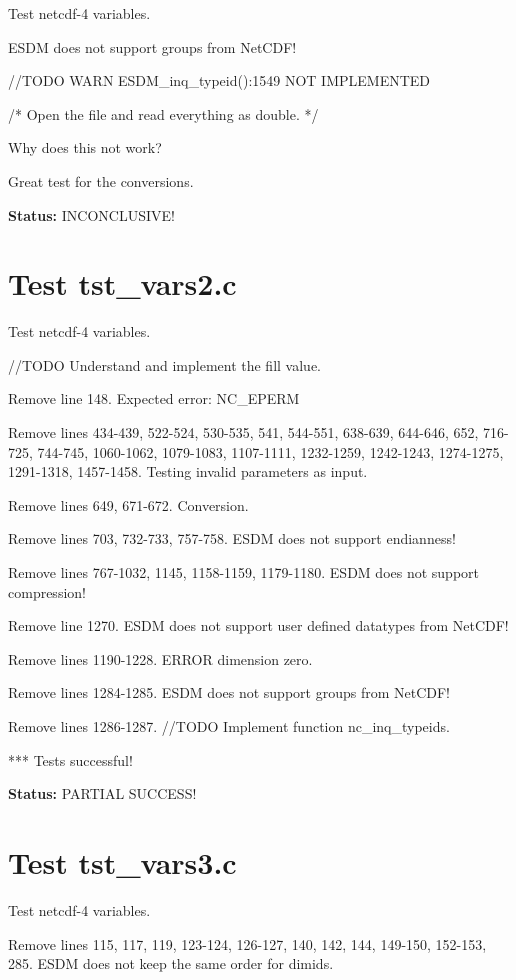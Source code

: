 Test netcdf-4 variables.

ESDM does not support groups from NetCDF!

//TODO WARN ESDM\_inq\_typeid():1549 NOT IMPLEMENTED

/* Open the file and read everything as double. */

Why does this not work?

Great test for the conversions.

{\bf \large Status: } INCONCLUSIVE!

\section{Test tst\_vars2.c}

Test netcdf-4 variables.

//TODO Understand and implement the fill value.

Remove line 148. Expected error: NC\_EPERM

Remove lines 434-439, 522-524, 530-535, 541, 544-551, 638-639, 644-646, 652, 716-725, 744-745, 1060-1062, 1079-1083, 1107-1111, 1232-1259, 1242-1243, 1274-1275, 1291-1318, 1457-1458. Testing invalid parameters as input.

Remove lines 649, 671-672. Conversion.

Remove lines 703, 732-733, 757-758. ESDM does not support endianness!

Remove lines 767-1032, 1145, 1158-1159, 1179-1180. ESDM does not support compression!

Remove line 1270. ESDM does not support user defined datatypes from NetCDF!

Remove lines 1190-1228. ERROR dimension zero.

Remove lines 1284-1285. ESDM does not support groups from NetCDF!

Remove lines 1286-1287. //TODO Implement function nc\_inq\_typeids.

*** Tests successful!

{\bf \large Status: } PARTIAL SUCCESS!

\section{Test tst\_vars3.c}

Test netcdf-4 variables.

Remove lines 115, 117, 119, 123-124, 126-127, 140, 142, 144, 149-150, 152-153, 285. ESDM does not keep the same order for dimids.

